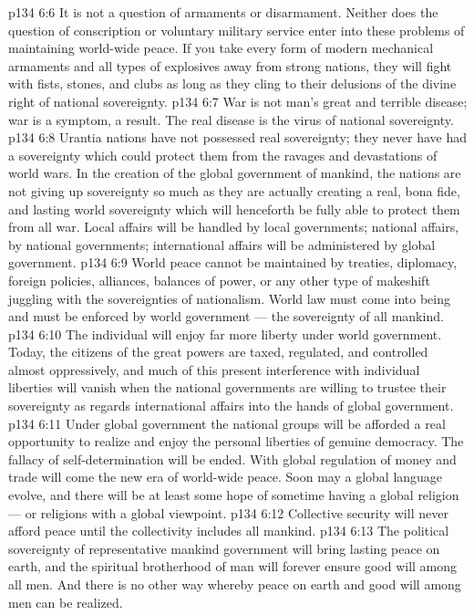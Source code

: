 \vs p134 6:6 It is not a question of armaments or disarmament. Neither does the question of conscription or voluntary military service enter into these problems of maintaining world\hyp{}wide peace. If you take every form of modern mechanical armaments and all types of explosives away from strong nations, they will fight with fists, stones, and clubs as long as they cling to their delusions of the divine right of national sovereignty.
\vs p134 6:7 War is not man’s great and terrible disease; war is a symptom, a result. The real disease is the virus of national sovereignty.
\vs p134 6:8 Urantia nations have not possessed real sovereignty; they never have had a sovereignty which could protect them from the ravages and devastations of world wars. In the creation of the global government of mankind, the nations are not giving up sovereignty so much as they are actually creating a real, bona fide, and lasting world sovereignty which will henceforth be fully able to protect them from all war. Local affairs will be handled by local governments; national affairs, by national governments; international affairs will be administered by global government.
\vs p134 6:9 World peace cannot be maintained by treaties, diplomacy, foreign policies, alliances, balances of power, or any other type of makeshift juggling with the sovereignties of nationalism. World law must come into being and must be enforced by world government --- the sovereignty of all mankind.
\vs p134 6:10 The individual will enjoy far more liberty under world government. Today, the citizens of the great powers are taxed, regulated, and controlled almost oppressively, and much of this present interference with individual liberties will vanish when the national governments are willing to trustee their sovereignty as regards international affairs into the hands of global government.
\vs p134 6:11 Under global government the national groups will be afforded a real opportunity to realize and enjoy the personal liberties of genuine democracy. The fallacy of self\hyp{}determination will be ended. With global regulation of money and trade will come the new era of world\hyp{}wide peace. Soon may a global language evolve, and there will be at least some hope of sometime having a global religion --- or religions with a global viewpoint.
\vs p134 6:12 Collective security will never afford peace until the collectivity includes all mankind.
\vs p134 6:13 The political sovereignty of representative mankind government will bring lasting peace on earth, and the spiritual brotherhood of man will forever ensure good will among all men. And there is no other way whereby peace on earth and good will among men can be realized.
